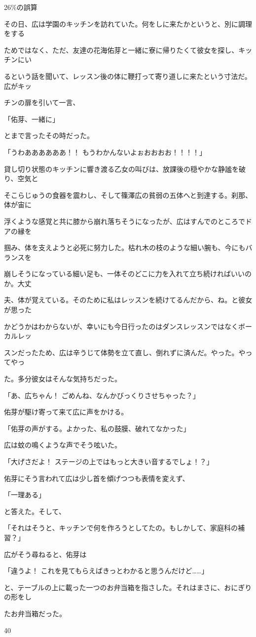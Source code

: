 26\%の誤算\par
その⽇、広は学園のキッチンを訪れていた。何をしに来たかというと、別に調理をする\par
ためではなく、ただ、友達の花海佑芽と⼀緒に寮に帰りたくて彼⼥を探し、キッチンにい\par
るという話を聞いて、レッスン後の体に鞭打って寄り道しに来たという⼨法だ。広がキッ\par
チンの扉を引いて⼀⾔、\par
「佑芽、⼀緒に」\par
とまで⾔ったその時だった。\par
「うわああああああ！！ もうわかんないよぉおおおお！！！！」\par
貸し切り状態のキッチンに響き渡る⼄⼥の叫びは、放課後の穏やかな静謐を破り、空気と\par
そこらじゅうの⾷器を震わし、そして篠澤広の貧弱の五体へと到達する。刹那、体が宙に\par
浮くような感覚と共に膝から崩れ落ちそうになったが、広はすんでのところでドアの縁を\par
掴み、体を⽀えようと必死に努⼒した。枯れ⽊の枝のような細い腕も、今にもバランスを\par
崩しそうになっている細い⾜も、⼀体そのどこに⼒を⼊れて⽴ち続ければいいのか。⼤丈\par
夫、体が覚えている。そのために私はレッスンを続けてるんだから、ね。と彼⼥が思った\par
かどうかはわからないが、幸いにも今⽇⾏ったのはダンスレッスンではなくボーカルレッ\par
スンだったため、広は⾟うじて体勢を⽴て直し、倒れずに済んだ。やった。やってやっ\par
た。多分彼⼥はそんな気持ちだった。\par
「あ、広ちゃん！ ごめんね、なんかびっくりさせちゃった？」\par
佑芽が駆け寄って来て広に声をかける。\par
「佑芽の声がする。よかった、私の⿎膜、破れてなかった」\par
広は蚊の鳴くような声でそう呟いた。\par
「⼤げさだよ！ ステージの上ではもっと⼤きい⾳するでしょ！？」\par
佑芽にそう⾔われて広は少し⾸を傾げつつも表情を変えず、\par
「⼀理ある」\par
と答えた。そして、\par
「それはそうと、キッチンで何を作ろうとしてたの。もしかして、家庭科の補習？」\par
広がそう尋ねると、佑芽は\par
「違うよ！ これを⾒てもらえばきっとわかると思うんだけど……」\par
と、テーブルの上に載った⼀つのお弁当箱を指さした。それはまさに、おにぎりの形をし\par
たお弁当箱だった。\par
40\par

